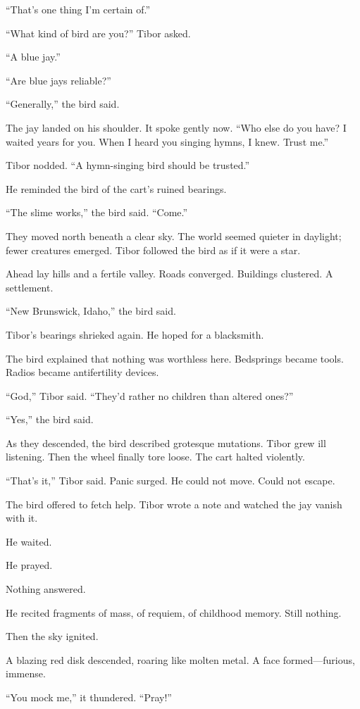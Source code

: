 “That’s one thing I’m certain of.”

“What kind of bird are you?” Tibor asked.

“A blue jay.”

“Are blue jays reliable?”

“Generally,” the bird said.

The jay landed on his shoulder. It spoke gently now. “Who else do you have? I waited years for you. When I heard you singing hymns, I knew. Trust me.”

Tibor nodded. “A hymn-singing bird should be trusted.”

He reminded the bird of the cart’s ruined bearings.

“The slime works,” the bird said. “Come.”

They moved north beneath a clear sky. The world seemed quieter in daylight; fewer creatures emerged. Tibor followed the bird as if it were a star.

Ahead lay hills and a fertile valley. Roads converged. Buildings clustered. A settlement.

“New Brunswick, Idaho,” the bird said.

Tibor’s bearings shrieked again. He hoped for a blacksmith.

The bird explained that nothing was worthless here. Bedsprings became tools. Radios became antifertility devices.

“God,” Tibor said. “They’d rather no children than altered ones?”

“Yes,” the bird said.

As they descended, the bird described grotesque mutations. Tibor grew ill listening. Then the wheel finally tore loose. The cart halted violently.

“That’s it,” Tibor said. Panic surged. He could not move. Could not escape.

The bird offered to fetch help. Tibor wrote a note and watched the jay vanish with it.

He waited.

He prayed.

Nothing answered.

He recited fragments of mass, of requiem, of childhood memory. Still nothing.

Then the sky ignited.

A blazing red disk descended, roaring like molten metal. A face formed—furious, immense.

“You mock me,” it thundered. “Pray!”

